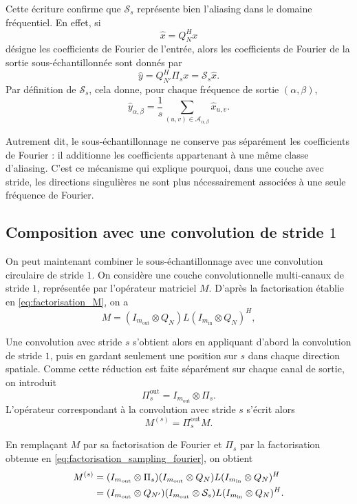 Cette écriture confirme que $\mathcal{S}_s$ représente bien l'aliasing dans le domaine fréquentiel.
En effet, si
\[
    \widehat{x}=Q_N^H x
\]
désigne les coefficients de Fourier de l'entrée, alors les coefficients de Fourier de la sortie sous-échantillonnée
sont donnés par
\[
    \widehat{y}
    =
    Q_{N'}^H\Pi_s x
    =
    \mathcal{S}_s \widehat{x}.
\]
Par définition de $\mathcal{S}_s$, cela donne, pour chaque fréquence de sortie $(\alpha,\beta)$,
\begin{equation}
    \widehat{y}_{\alpha,\beta}
    =
    \frac{1}{s}
    \sum_{(u,v)\in\mathcal{A}_{\alpha,\beta}}
    \widehat{x}_{u,v}.
    \label{eq:somme_coefficients_aliasing}
\end{equation}

Autrement dit, le sous-échantillonnage ne conserve pas séparément les coefficients de Fourier :
il additionne les coefficients appartenant à une même classe d'aliasing. C'est ce mécanisme qui explique
pourquoi, dans une couche avec stride, les directions singulières ne sont plus nécessairement associées
à une seule fréquence de Fourier.

\subsection{Composition avec une convolution de stride $1$}

On peut maintenant combiner le sous-échantillonnage avec une convolution circulaire de stride $1$.
On considère une couche convolutionnelle multi-canaux de stride $1$, représentée par l'opérateur
matriciel $M$. D'après la factorisation établie en \eqref{eq:factorisation_M}, on a
\begin{equation*}
    M
    =
    (I_{m_{\mathrm{out}}} \otimes Q_N)
    L
    (I_{m_{\mathrm{in}}} \otimes Q_N)^H,
\end{equation*}

Une convolution avec stride $s$ s'obtient alors en appliquant d'abord la convolution de stride $1$,
puis en gardant seulement une position sur $s$ dans chaque direction spatiale. Comme cette réduction
est faite séparément sur chaque canal de sortie, on introduit
\[
    \Pi_s^{\mathrm{out}}
    =
    I_{m_{\mathrm{out}}} \otimes \Pi_s.
\]
L'opérateur correspondant à la convolution avec stride $s$ s'écrit alors
\begin{equation*}
    M^{(s)}
    =
    \Pi_s^{\mathrm{out}} M.
\end{equation*}

En remplaçant $M$ par sa factorisation de Fourier et $\Pi_s$ par la factorisation obtenue en
\eqref{eq:factorisation_sampling_fourier}, on obtient
\begin{align*}
    M^{(s)}
    &=
    (I_{m_{\mathrm{out}}} \otimes \Pi_s)
    (I_{m_{\mathrm{out}}} \otimes Q_N)
    L
    (I_{m_{\mathrm{in}}} \otimes Q_N)^H \notag \\
    &=
    (I_{m_{\mathrm{out}}} \otimes Q_{N'})
    (I_{m_{\mathrm{out}}} \otimes \mathcal{S}_s)
    L
    (I_{m_{\mathrm{in}}} \otimes Q_N)^H.
\end{align*}

